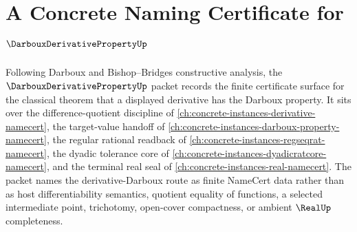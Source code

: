 \chapter{A Concrete Naming Certificate for $\DarbouxDerivativePropertyUp$}
\label{ch:concrete-instances-darboux-derivative-property-namecert}

Following Darboux and Bishop--Bridges constructive analysis, the $\DarbouxDerivativePropertyUp$ packet records the finite certificate surface for the classical theorem that a displayed derivative has the Darboux property. It sits over the difference-quotient discipline of \autoref{ch:concrete-instances-derivative-namecert}, the target-value handoff of \autoref{ch:concrete-instances-darboux-property-namecert}, the regular rational readback of \autoref{ch:concrete-instances-regseqrat-namecert}, the dyadic tolerance core of \autoref{ch:concrete-instances-dyadicratcore-namecert}, and the terminal real seal of \autoref{ch:concrete-instances-real-namecert}. The packet names the derivative-Darboux route as finite NameCert data rather than as host differentiability semantics, quotient equality of functions, a selected intermediate point, trichotomy, open-cover compactness, or ambient $\RealUp$ completeness.

